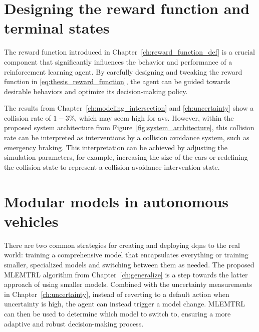 \section{Designing the reward function and terminal states}
The reward function introduced in Chapter~\ref{ch:reward_function_def} is a crucial component that significantly influences the behavior and performance of a reinforcement learning agent. By carefully designing and tweaking the reward function in \eqref{eq:thesis_reward_function}, the agent can be guided towards desirable behaviors and optimize its decision-making policy. 

The results from Chapter~\ref*{ch:modeling_intersection} and \ref{ch:uncertainty} show a collision rate of $1-3\%$, which may seem high for \glspl{av}. However, within the proposed system architecture from Figure~\ref{fig:system_architecture}, this collision rate can be interpreted as interventions by a collision avoidance system, such as emergency braking. This interpretation can be achieved by adjusting the simulation parameters, for example, increasing the size of the cars or redefining the collision state to represent a collision avoidance intervention state.



\section{Modular models in autonomous vehicles}
There are two common strategies for creating and deploying \glspl{dqn} to the real world: training a comprehensive model that encapsulates everything or training smaller, specialized models and switching between them as needed. The proposed MLEMTRL algorithm from Chapter~\ref{ch:generalize} is a step towards the latter approach of using smaller models. Combined with the uncertainty measurements in Chapter~\ref{ch:uncertainty}, instead of reverting to a default action when uncertainty is high, the agent can instead trigger a model change. MLEMTRL can then be used to determine which model to switch to, ensuring a more adaptive and robust decision-making process.

